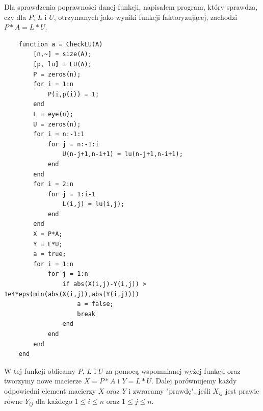 \documentclass[12pt,a4paper]{article}
\begin{document}
  Dla sprawdzenia poprawności danej funkcji, napisałem program, który sprawdza, czy
  dla $P$, $L$ i $U$, otrzymanych jako wyniki funkcji faktoryzującej, zachodzi
  $P*A=L*U$.
\begin{Verbatim}
    function a = CheckLU(A)
        [n,~] = size(A);
        [p, lu] = LU(A);
        P = zeros(n);
        for i = 1:n
            P(i,p(i)) = 1;
        end
        L = eye(n);
        U = zeros(n);
        for i = n:-1:1
            for j = n:-1:i
                U(n-j+1,n-i+1) = lu(n-j+1,n-i+1);
            end
        end
        for i = 2:n
            for j = 1:i-1
                L(i,j) = lu(i,j);
            end
        end
        X = P*A;
        Y = L*U;
        a = true;
        for i = 1:n
            for j = 1:n
                if abs(X(i,j)-Y(i,j)) > 1e4*eps(min(abs(X(i,j)),abs(Y(i,j))))
                    a = false;
                    break
                end
            end
        end
    end
\end{Verbatim}
W tej funkcji oblicamy $P$, $L$ i $U$ za pomocą wspomnianej wyżej funkcji oraz
tworzymy nowe macierze $X=P*A$ i $Y=L*U$. Dalej porównujemy każdy odpowiedni element
macierzy $X$ oraz $Y$ i zwracamy "prawdę", jeśli $X_{ij}$ jest prawie równe
$Y_{ij}$ dla każdego $1 \leq i \leq n$ oraz $1 \leq j \leq n$.
\end{document}
